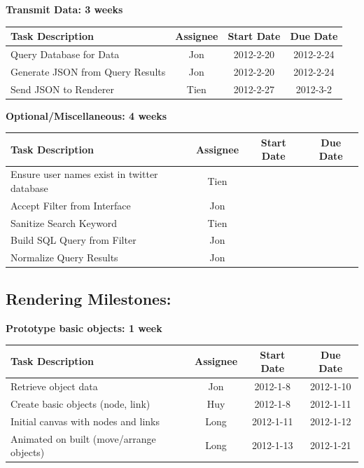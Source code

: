 \documentclass[12pt, letterpaper]{article}
\begin{document}
  \begin{center}
		{\bf Transmit Data: 3 weeks}
    \begin{tabular}{| p{8.3cm} || c | c | c | }
      \hline
      Task Description & Assignee & Start Date & Due Date \\
      \hline
	    Query Database for Data & Jon & 2012-2-20 & 2012-2-24 \\
	    Generate JSON from Query Results & Jon & 2012-2-20 & 2012-2-24 \\
	    Send JSON to Renderer & Tien & 2012-2-27 & 2012-3-2 \\
      \hline
    \end{tabular}
  \end{center}
  
  \begin{center}
		{\bf Optional/Miscellaneous: 4 weeks}
    \begin{tabular}{| p{8.3cm} || c | c | c | }
      \hline
      Task Description & Assignee & Start Date & Due Date \\
      \hline
		Ensure user names exist in twitter database & Tien & & \\
	    Accept Filter from Interface & Jon & & \\
	    Sanitize Search Keyword & Tien & & \\
	    Build SQL Query from Filter & Jon & & \\
      	Normalize Query Results & Jon & & \\
      \hline
    \end{tabular}
  \end{center}
  
\subsection{Rendering Milestones:}

  \begin{center}
		{\bf Prototype basic objects: 1 week}
    \begin{tabular}{| p{8.3cm} || c | c | c | }
      \hline
      Task Description & Assignee & Start Date & Due Date \\
      \hline
			Retrieve object data & Jon & 2012-1-8 & 2012-1-10 \\
	    Create basic objects (node, link)& Huy & 2012-1-8 & 2012-1-11 \\
			Initial canvas with nodes and links & Long & 2012-1-11 & 2012-1-12 \\
	    Animated on built (move/arrange objects) & Long & 2012-1-13 & 2012-1-21 \\
      \hline
    \end{tabular}
  \end{center}
\end{document}
